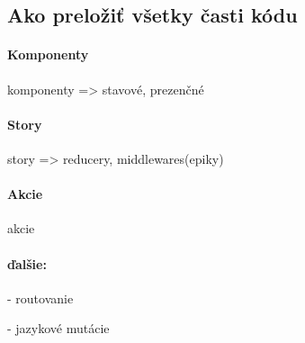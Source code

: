 \subsection{Ako preložiť všetky časti kódu}
\TODO

\paragraph{Komponenty}
komponenty => stavové, prezenčné

\paragraph{Story}
story => reducery, middlewares(epiky)

\paragraph{Akcie}
akcie

\paragraph{ďalšie:}
- routovanie

- jazykové mutácie